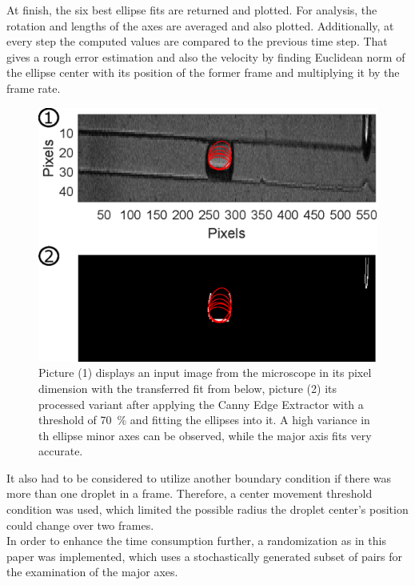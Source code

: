 At finish, the six best ellipse fits are returned and plotted. For analysis, the rotation and lengths of the axes are averaged and also plotted. Additionally, at every step the computed values are compared to the previous time step. That gives a rough error estimation and also the velocity by finding Euclidean norm of the ellipse center with its position of the former frame and multiplying it by the frame rate. 
\begin{figure}[h]
	\centering
	\includegraphics[clip,width=\linewidth,trim={0 0 0 0mm}]{Ressourcen/Tracking/LiveFitting}
	\caption{Picture (1) displays an input image from the microscope in its pixel dimension with the transferred fit from below, picture (2) its processed variant after applying the Canny Edge Extractor with a threshold of \SI{70}{\percent} and fitting the ellipses into it. A high variance in th ellipse minor axes can be observed, while the major axis fits very accurate.}
	\label{fig:tracking:livefitting}
\end{figure}
It also had to be considered to utilize another boundary condition if there was more than one droplet in a frame. Therefore, a center movement threshold condition was used, which limited the possible radius the droplet center's position could change over two frames.\\ In order to enhance the time consumption further, a randomization as in this paper was implemented, which uses a stochastically generated subset of pairs for the examination of the major axes.\cite{lit:tracking:randomization}
\newpage

